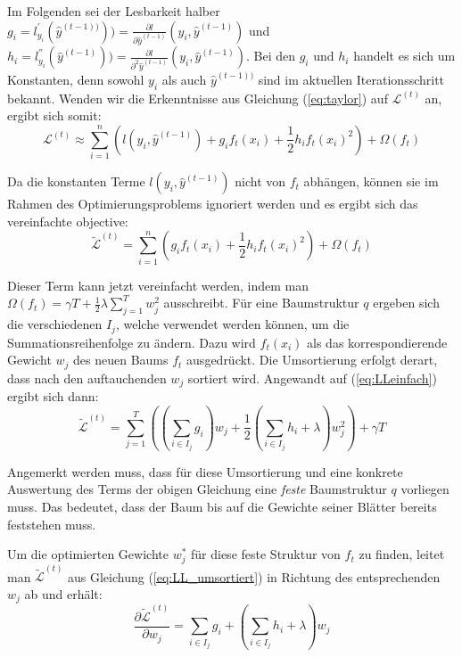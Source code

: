 \documentclass[a4paper,12pt]{scrartcl}
\newcommand{\LL}{\ensuremath{\mathcal{L}}}
\begin{document}
Im Folgenden sei der Lesbarkeit halber $g_i = l_{y_i}^{'}(\hat{y}^{(t-1))}) ) = \frac{\partial l}{\partial \hat{y}^{(t-1)}}(y_i,\hat{y}^{(t-1)})$ und $h_i = l_{y_i}^{''}(\hat{y}^{(t-1)}) ) = \frac{\partial l}{\partial^2 \hat{y}^{(t-1)}}(y_i,\hat{y}^{(t-1)})$. Bei den $g_i$ und $h_i$ handelt es sich um Konstanten, denn sowohl $y_i$ als auch $\hat{y}^{(t-1))}$ sind im aktuellen Iterationsschritt bekannt. Wenden wir die Erkenntnisse aus Gleichung (\ref{eq:taylor}) auf $\LL^{(t)}$ an, ergibt sich somit:
\begin{equation}
	 \LL^{(t)} \approx \sum_{i=1}^{n} (l(y_i,\hat{y}^{(t-1)}) + g_if_t(x_i) + \frac{1}{2} h_i f_t(x_i)^2) + \Omega(f_t)
\end{equation}

Da die konstanten Terme $l(y_i,\hat{y}^{(t-1)})$ nicht von $f_t$ abhängen, können sie im Rahmen des Optimierungsproblems ignoriert werden und es ergibt sich das vereinfachte objective:
\begin{equation} \label{eq:LLeinfach}
\tilde{\LL}^{(t)} = \sum_{i=1}^{n}( g_if_t(x_i) + \frac{1}{2} h_i f_t(x_i)^2) + \Omega(f_t)
\end{equation}

Dieser Term kann jetzt vereinfacht werden, indem man $\Omega(f_t) = \gamma T + \frac{1}{2}\lambda \sum_{j=1}^{T} w_j^2$ ausschreibt. Für eine Baumstruktur $q$ ergeben sich die verschiedenen $I_j$, welche verwendet werden können, um die Summationsreihenfolge zu ändern. Dazu wird $f_t(x_i)$ als das korrespondierende Gewicht $w_j$ des neuen Baums $f_t$ ausgedrückt. Die Umsortierung erfolgt derart, dass nach den auftauchenden $w_j$ sortiert wird. Angewandt auf (\ref{eq:LLeinfach}) ergibt sich dann:
\begin{equation} \label{eq:LL_umsortiert}
	\tilde{\LL}^{(t)} = \sum_{j=1}^T\left( (\sum_{i \in I_j} g_i) w_j + \frac{1}{2} (\sum_{i \in I_j} h_i + \lambda)w_j^2 \right) + \gamma T
\end{equation}

Angemerkt werden muss, dass für diese Umsortierung und eine konkrete Auswertung des Terms der obigen Gleichung eine \textit{feste} Baumstruktur $q$ vorliegen muss. Das bedeutet, dass der Baum bis auf die Gewichte seiner Blätter bereits feststehen muss.

Um die optimierten Gewichte $w^*_j$ für diese feste Struktur von $f_t$ zu finden, leitet man $\tilde{\LL}^{(t)}$ aus Gleichung (\ref{eq:LL_umsortiert}) in Richtung des entsprechenden $w_j$ ab und erhält:
\begin{equation} \label{eq:LL_ableitung}
	\frac{\partial \tilde{\LL}^{(t)}}{\partial w_j} = \sum_{i \in I_j} g_i + (\sum_{i \in I_j} h_i + \lambda)w_j
\end{equation}
\end{document}
